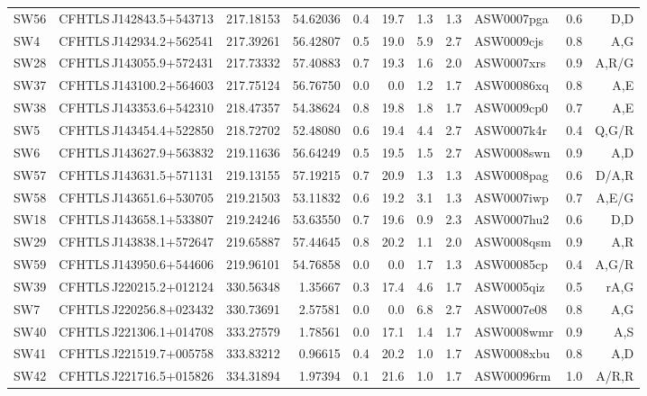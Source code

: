 \documentclass[useAMS,usenatbib,a4paper]{mn2e}
\begin{document}
\begin{center}
\begin{longtable}{llrrrrrrlrr}
SW56 & CFHTLS\,J142843.5$+$543713 & 217.18153 &    54.62036 &  0.4 & 19.7 &  1.3 &  1.3 & ASW0007pga &  0.6 &  D,D   \\ 
SW4  & CFHTLS\,J142934.2$+$562541 & 217.39261 &    56.42807 &  0.5 & 19.0 &  5.9 &  2.7 & ASW0009cjs &  0.8 &  A,G   \\ 
SW28 & CFHTLS\,J143055.9$+$572431 & 217.73332 &    57.40883 &  0.7 & 19.3 &  1.6 &  2.0 & ASW0007xrs &  0.9 &  A,R/G   \\ 
SW37 & CFHTLS\,J143100.2$+$564603 & 217.75124 &    56.76750 &  0.0 &  0.0 &  1.2 &  1.7 & ASW00086xq &  0.8 &  A,E   \\ 
SW38 & CFHTLS\,J143353.6$+$542310 & 218.47357 &    54.38624 &  0.8 & 19.8 &  1.8 &  1.7 & ASW0009cp0 &  0.7 &  A,E   \\ 
SW5  & CFHTLS\,J143454.4$+$522850 & 218.72702 &    52.48080 &  0.6 & 19.4 &  4.4 &  2.7 & ASW0007k4r &  0.4 &  Q,G/R   \\ 
SW6  & CFHTLS\,J143627.9$+$563832 & 219.11636 &    56.64249 &  0.5 & 19.5 &  1.5 &  2.7 & ASW0008swn &  0.9 &  A,D   \\ 
SW57 & CFHTLS\,J143631.5$+$571131 & 219.13155 &    57.19215 &  0.7 & 20.9 &  1.3 &  1.3 & ASW0008pag &  0.6 &  D/A,R   \\ 
SW58 & CFHTLS\,J143651.6$+$530705 & 219.21503 &    53.11832 &  0.6 & 19.2 &  3.1 &  1.3 & ASW0007iwp &  0.7 &  A,E/G   \\ 
SW18 & CFHTLS\,J143658.1$+$533807 & 219.24246 &    53.63550 &  0.7 & 19.6 &  0.9 &  2.3 & ASW0007hu2 &  0.6 &  D,D   \\ 
SW29 & CFHTLS\,J143838.1$+$572647 & 219.65887 &    57.44645 &  0.8 & 20.2 &  1.1 &  2.0 & ASW0008qsm &  0.9 &  A,R   \\ 
SW59 & CFHTLS\,J143950.6$+$544606 & 219.96101 &    54.76858 &  0.0 &  0.0 &  1.7 &  1.3 & ASW00085cp &  0.4 &  A,G/R   \\ 
SW39 & CFHTLS\,J220215.2$+$012124 & 330.56348 &     1.35667 &  0.3 & 17.4 &  4.6 &  1.7 & ASW0005qiz &  0.5 &  rA,G   \\ 
SW7  & CFHTLS\,J220256.8$+$023432 & 330.73691 &     2.57581 &  0.0 &  0.0 &  6.8 &  2.7 & ASW0007e08 &  0.8 &  A,G   \\ 
SW40 & CFHTLS\,J221306.1$+$014708 & 333.27579 &     1.78561 &  0.0 & 17.1 &  1.4 &  1.7 & ASW0008wmr &  0.9 &  A,S   \\ 
SW41 & CFHTLS\,J221519.7$+$005758 & 333.83212 &     0.96615 &  0.4 & 20.2 &  1.0 &  1.7 & ASW0008xbu &  0.8 &  A,D   \\ 
SW42 & CFHTLS\,J221716.5$+$015826 & 334.31894 &     1.97394 &  0.1 & 21.6 &  1.0 &  1.7 & ASW00096rm &  1.0 &  A/R,R   \\ 
\end{longtable}
\end{center}
\end{document}
